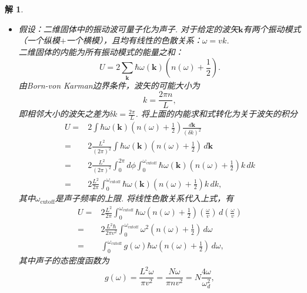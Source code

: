 \documentclass[UTF8,10pt,a4paper]{article}
\theoremstyle{Problem}
\theoremstyle{Solution}
\newtheorem*{sol}{解}
\begin{document}
\begin{sol}
    \begin{itemize}
        \item[$\triangleright$] 假设：二维固体中的振动波可量子化为声子. 对于给定的波矢$\bm{k}$有两个振动模式（一个纵模$+$一个横模），且均有线性的色散关系：$\omega=vk$.\\
        二维固体的内能为所有振动模式的能量之和：
        \begin{equation}
            U=2\sum_{\bm{k}}\hbar\omega(\bm{k})\left(n(\omega)+\frac{1}{2}\right).
        \end{equation}
        由Born-von Karman边界条件，波矢的可能大小为
        \begin{equation}
            k=\frac{2\pi n}{L},
        \end{equation}
        即相邻大小的波矢之差为$\delta k=\frac{2\pi}{L}$. 将上面的内能求和式转化为关于波矢的积分
        \begin{align}
            \nonumber U=&2\int\hbar\omega(\bm{k})\left(n(\omega)+\frac{1}{2}\right)\frac{d\bm{k}}{(\delta k)^2}\\
            \nonumber=&2\frac{L^2}{(2\pi)^2}\int\hbar\omega(\bm{k})\left(n(\omega)+\frac{1}{2}\right)\,d\bm{k}\\
            \nonumber=&2\frac{L^2}{(2\pi)^2}\int_0^{2\pi}d\phi\int_0^{\omega_{\text{cutoff}}}\hbar\omega(\bm{k})\left(n(\omega)+\frac{1}{2}\right)k\,dk\\
            =&2\frac{L^2}{2\pi}\int_0^{\omega_{\text{cutoff}}}\hbar\omega(\bm{k})\left(n(\omega)+\frac{1}{2}\right)k\,dk,
        \end{align}
        其中$\omega_{\text{cutoff}}$是声子频率的上限. 将线性色散关系代入上式，有
        \begin{align}
            \nonumber U=&2\frac{L^2}{2\pi}\int_0^{\omega_{\text{cutoff}}}\hbar\omega\left(n(\omega)+\frac{1}{2}\right)\left(\frac{\omega}{v}\right)\,d\left(\frac{\omega}{v}\right)\\
            \nonumber=&2\frac{L^2\hbar}{2\pi v^2}\int_0^{\omega_{\text{cutoff}}}\omega^2\left(n(\omega)+\frac{1}{2}\right)\,d\omega\\
            =&\int_0^{\omega_{\text{cutoff}}}g(\omega)\hbar\omega\left(n(\omega)+\frac{1}{2}\right)\,d\omega,
        \end{align}
        其中声子的态密度函数为
        \begin{equation}
            g(\omega)=\frac{L^2\omega}{\pi v^2}=\frac{N\omega}{\pi nv^2}=N\frac{4\omega}{\omega_d^2},
        \end{equation}

\end{itemize}
\end{sol}
\end{document}
